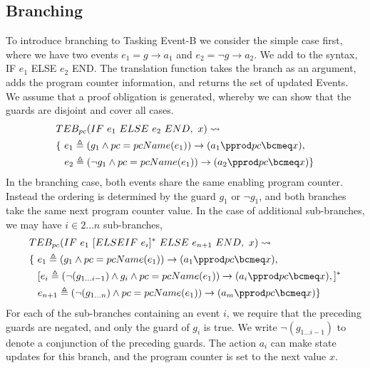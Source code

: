 \subsection{Branching}
To introduce branching to Tasking Event-B we consider the simple case first, where we have two events $e_1 = g \rightarrow a_1$ and $e_2 = \lnot g \rightarrow a_2$. We add to the syntax, IF $e_1$ ELSE $e_2$ END. The translation function takes the branch as an argument, adds the program counter information, and returns the set of updated Events. We assume that a proof obligation is generated, whereby we can show that the guards are disjoint and cover all cases.
%
\begin{equation}
\begin{split}
&TEB_{pc}(IF~ e_1~ ELSE~ e_2~ END,~  x) \leadsto\\
& \{~ e_1 \triangleq (g_1 \land pc = pcName(e_1)) \rightarrow (a_1 \pprod pc \bcmeq x),\\
&\hspace*{0.3cm}e_2 \triangleq (\lnot g_1 \land pc = pcName(e_1)) \rightarrow (a_2 \pprod pc \bcmeq x) \}
\end{split}
\notag
\end{equation}
%
In the branching case, both events share the same enabling program counter. Instead the ordering is determined by the guard $g_1$ or $\lnot g_1$, and both branches take the same next program counter value. In the case of additional sub-branches, we may have $i \in 2\ldots n$ sub-branches,
%
\begin{equation}
\begin{split}
&TEB_{pc}(IF~ e_1~ [ELSEIF~ e_{i}]^* ~ ELSE~ e_{n+1}~ END,~  x) \leadsto\\
& \{~ e_1 \triangleq (g_1 \land pc = pcName(e_1)) \rightarrow (a_1 \pprod pc \bcmeq x),\\
& \hspace*{0.3cm}[e_i \triangleq (\lnot (g_{1\ldots i-1}) \land g_i \land pc = pcName(e_1)) \rightarrow (a_i \pprod pc \bcmeq x),]^*\\
&\hspace*{0.3cm}e_{n+1} \triangleq (\lnot( g_{1\ldots n}) \land pc = pcName(e_1)) \rightarrow (a_m \pprod pc \bcmeq x) \}
\end{split}
\notag
\end{equation}
%
For each of the sub-branches containing an event $i$, we require that the preceding guards are negated, and only the guard of $g_i$ is true. We write $\lnot (g_{1\ldots i-1})$ to denote a conjunction of the preceding guards. The action $a_i$ can make state updates for this branch, and the program counter is set to the next value $x$.    

